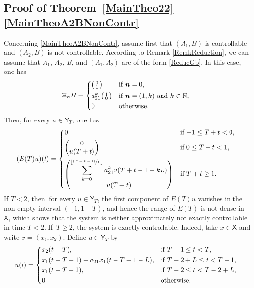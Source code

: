 \documentclass[JEP,XML,SOM,Unicode]{cedram}
\newcommand{\psfrac}[2]{\sfrac{(#1)}{#2}}
\newcommand{\bn}{\boldsymbol{n}}
\newenvironment{smallpmatrix}{\big(\begin{smallmatrix}}{\end{smallmatrix}\big)}
\theoremstyle{plain}
\theoremstyle{definition}
\newcommand{\floor}[1]{\left\lfloor #1 \right\rfloor}
\begin{document}
\subsection{Proof of Theorem~\ref{MainTheo22}\eqref{MainTheoA2BNonContr}}

Concerning \eqref{MainTheoA2BNonContr}, assume first that $(A_1, B)$ is controllable and $(A_2, B)$ is not controllable. According to Remark \ref{RemkReduction}, we can assume that $A_1$, $A_2$, $B$, and $(\Lambda_1, \Lambda_2)$ are of the form \eqref{ReducGb}. In this case, one has
\[
\Xi_{\bn} B =
\begin{dcases*}
\begin{smallpmatrix}0 \\ 1 \\\end{smallpmatrix} & if $\bn = 0$, \\
a_{21}^k \begin{smallpmatrix}1 \\ 0 \\\end{smallpmatrix} & if $\bn = (1, k)$ and $k \in \mathbb N$, \\
0 & otherwise.
\end{dcases*}
\]
Then, for every $u \in \mathsf Y_T$, one has
\begin{equation}
\label{ETu-NewCase}
(E(T) u)(t) =
\begin{dcases*}
0 & if $-1 \leq T + t < 0$, \\
\begin{pmatrix}0 \\ u(T + t)\end{pmatrix} & if $0 \leq T + t < 1$, \\
\begin{pmatrix} \displaystyle\sum_{k=0}^{\floor{\psfrac{T + t - 1}{L}}} a_{21}^k u(T + t - 1 - k L) \\ u(T + t)\end{pmatrix} & if $T + t \geq 1$.
\end{dcases*}
\end{equation}
If $T < 2$, then, for every $u \in \mathsf Y_T$, the first component of $E(T) u$ vanishes in the non-empty interval $(-1, 1-T)$, and hence the range of $E(T)$ is not dense in $\mathsf X$, which shows that the system is neither approximately nor exactly controllable in time $T < 2$. If~$T \geq 2$, the system is exactly controllable. Indeed, take $x \in \mathsf X$ and write $x = (x_1, x_2)$. Define $u \in \mathsf Y_T$ by
\[
u(t) =
\begin{dcases*}
x_2(t - T), & if $T - 1 \leq t < T$, \\
x_1(t - T + 1) - a_{21} x_1(t - T + 1 - L), & if $T - 2 + L \leq t < T - 1$, \\
x_1(t - T + 1), & if $T - 2 \leq t < T - 2 + L$, \\
0, & otherwise.
\end{dcases*}
\]
\end{document}
